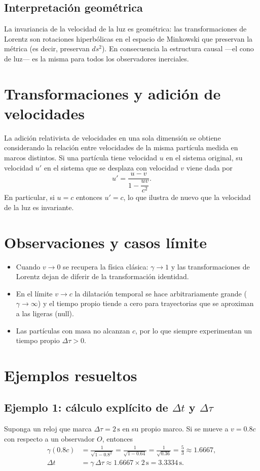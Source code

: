 \documentclass[12pt,oneside]{book}
\begin{document}
\section{Interpretación geométrica}
La invariancia de la velocidad de la luz es geométrica: las transformaciones de Lorentz son rotaciones hiperbólicas en el espacio de Minkowski que preservan la métrica (es decir, preservan $ds^2$). En consecuencia la estructura causal —el cono de luz— es la misma para todos los observadores inerciales.

\chapter{Transformaciones y adición de velocidades}
La adición relativista de velocidades en una sola dimensión se obtiene considerando la relación entre velocidades de la misma partícula medida en marcos distintos. Si una partícula tiene velocidad $u$ en el sistema original, su velocidad $u'$ en el sistema que se desplaza con velocidad $v$ viene dada por
\begin{equation}\label{eq:vel_add}
  u' = \frac{u-v}{1-\dfrac{uv}{c^2}}.
\end{equation}
En particular, si $u=c$ entonces $u'=c$, lo que ilustra de nuevo que la velocidad de la luz es invariante.

\chapter{Observaciones y casos límite}
\begin{itemize}
  \item Cuando $v\to 0$ se recupera la física clásica: $\gamma\to1$ y las transformaciones de Lorentz dejan de diferir de la transformación identidad.
  \item En el límite $v\to c$ la dilatación temporal se hace arbitrariamente grande ($\gamma\to\infty$) y el tiempo propio tiende a cero para trayectorias que se aproximan a las ligeras (null).
  \item Las partículas con masa no alcanzan $c$, por lo que siempre experimentan un tiempo propio $\Delta\tau>0$.
\end{itemize}

\chapter{Ejemplos resueltos}
\section{Ejemplo 1: cálculo explícito de $\Delta t$ y $\Delta\tau$}
Suponga un reloj que marca $\Delta\tau=2\,\mathrm{s}$ en su propio marco. Si se mueve a $v=0.8c$ con respecto a un observador $O$, entonces
\begin{align*}
  \gamma(0.8c) &= \frac{1}{\sqrt{1-0.8^2}} = \frac{1}{\sqrt{1-0.64}}=\frac{1}{\sqrt{0.36}}=\tfrac{5}{3}\approx1.6667,\\
  \Delta t &= \gamma\,\Delta\tau \approx 1.6667\times2\,\mathrm{s}=3.3334\,\mathrm{s}.
\end{align*}
\end{document}
